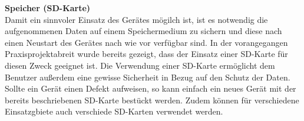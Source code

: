 \textbf{Speicher (SD-Karte)}\\
Damit ein sinnvoler Einsatz des Gerätes mögilch ist, ist es notwendig die aufgenommenen Daten auf einem Speichermedium zu sichern und diese nach einen Neustart des Gerätes nach wie vor verfügbar sind. In der vorangegangen Praxisprojektabreit wurde bereits gezeigt, dass der Einsatz einer SD-Karte für diesen Zweck geeignet ist. Die Verwendung einer SD-Karte ermöglicht dem Benutzer außerdem eine gewisse Sicherheit in Bezug auf den Schutz der Daten. Sollte ein Gerät einen Defekt aufweisen, so kann einfach ein neues Gerät mit der bereits beschriebenen SD-Karte bestückt werden. Zudem können für verschiedene Einsatzgbiete auch verschiede SD-Karten verwendet werden.